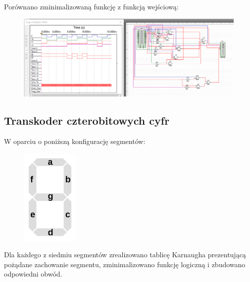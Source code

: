\documentclass[12pt,a4paper]{article}
\begin{document}
Porównano zminimalizowaną funkcję z funkcją wejściową:

\begin{figure}[H]
\includegraphics[width=\textwidth]{2b}
\end{figure}

\newpage
\subsection{Transkoder czterobitowych cyfr}
W oparciu o poniższą konfigurację segmentów:

\begin{figure}[H]
\centering
\includegraphics[width=0.25\textwidth]{7seg/segconf}
\end{figure}

Dla każdego z siedmiu segmentów zrealizowano tablicę Karnaugha prezentującą pożądane zachowanie segmentu, zminimalizowano funkcję logiczną i zbudowano odpowiedni obwód.
\end{document}
